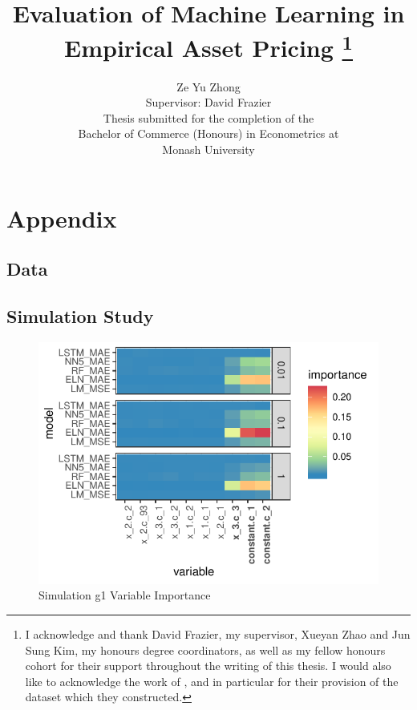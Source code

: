 \documentclass[11pt, a4paper, table]{article}
\title{Evaluation of Machine Learning in Empirical Asset Pricing
\thanks{I acknowledge and thank David Frazier, my supervisor, Xueyan Zhao and Jun Sung Kim, my honours degree coordinators, as well as my fellow honours cohort for their support throughout the writing of this thesis. I would also like to acknowledge the work of \cite{gu_empirical_2018}, and in particular for their provision of the dataset which they constructed.}
}
\author{Ze Yu Zhong \\
Supervisor: David Frazier \\ 
Thesis submitted for the completion of the \\
Bachelor of Commerce (Honours) in Econometrics at \\
Monash University}
\begin{document}
\section{Appendix}

\subsection{Data}

\subsection{Simulation Study}





\newpage



\FloatBarrier


\begin{figure}
	\includegraphics[]{../Results/simulation/graphics/simulation_g1_vi.pdf}
	\caption{Simulation g1 Variable Importance}
\end{figure}
\end{document}
